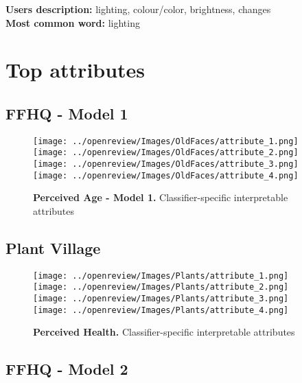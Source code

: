 \textbf{Users description:} lighting, colour/color, brightness, changes \\
\textbf{Most common word:} lighting


\newpage
\section{Top attributes}\label{appendix:top attributes}

\subsection{FFHQ - Model 1}
\begin{figure}[hbt!]
  \texttt{[image: ../openreview/Images/OldFaces/attribute\_1.png]}
\endminipage\hfill
{}
  \texttt{[image: ../openreview/Images/OldFaces/attribute\_2.png]}
\endminipage\hfill
{}
  \texttt{[image: ../openreview/Images/OldFaces/attribute\_3.png]}
\endminipage\hfill
{}
  \texttt{[image: ../openreview/Images/OldFaces/attribute\_4.png]}
\endminipage\hfill
\caption{\textbf{Perceived Age - Model 1.} Classifier-specific interpretable attributes}
\label{fig: introduction}
\end{figure}


\newpage
\subsection{Plant Village}

\begin{figure}[hbt!]
  \texttt{[image: ../openreview/Images/Plants/attribute\_1.png]}
\endminipage\hfill
{}
  \texttt{[image: ../openreview/Images/Plants/attribute\_2.png]}
\endminipage\hfill
{}
  \texttt{[image: ../openreview/Images/Plants/attribute\_3.png]}
\endminipage\hfill
{}
  \texttt{[image: ../openreview/Images/Plants/attribute\_4.png]}
\endminipage\hfill
\caption{\textbf{Perceived Health.} Classifier-specific interpretable attributes}
\label{fig: introduction}
\end{figure}


\newpage
\subsection{FFHQ - Model 2}

